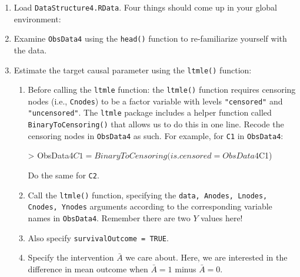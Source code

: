 \documentclass[answers]{exam}
\newenvironment{packed_item}{
\begin{itemize}
 \setlength{\itemsep}{0pt}
  \setlength{\parskip}{0pt}
  \setlength{\parsep}{0pt}
}{\end{itemize}}
\begin{document}
\begin{enumerate}
\item Load \texttt{DataStructure4.RData}. Four things should come up in your global environment:
\item Examine \texttt{ObsData4} using the \texttt{head()} function to re-familiarize yourself with the data.
\item Estimate the target causal parameter using the \texttt{ltmle()} function:
\begin{enumerate}
\item Before calling the \texttt{ltmle} function: the \texttt{ltmle()} function requires censoring nodes (i.e., \texttt{Cnodes}) to be a factor variable with levels \texttt{"censored"} and \texttt{"uncensored"}. The \texttt{ltmle} package includes a helper function called \texttt{BinaryToCensoring()} that allows us to do this in one line. Recode the censoring nodes in \texttt{ObsData4} as such. For example, for \texttt{C1} in \texttt{ObsData4}:
\begin{Schunk}
\begin{Sinput}
> ObsData4$C1 = BinaryToCensoring(is.censored = ObsData4$C1)
\end{Sinput}
\end{Schunk}
Do the same for \texttt{C2}.
\item Call the \texttt{ltmle()} function, specifying the \texttt{data, Anodes, Lnodes, Cnodes, Ynodes} arguments according to the corresponding variable names in \texttt{ObsData4}. Remember there are two $Y$ values here!
\item Also specify \texttt{survivalOutcome = TRUE}.
\item Specify the intervention $\bar{A}$ we care about. Here, we are interested in the difference in mean outcome when $\bar{A} = 1$ minus $\bar{A} = 0$. 

\end{enumerate}
\end{enumerate}
\end{document}
